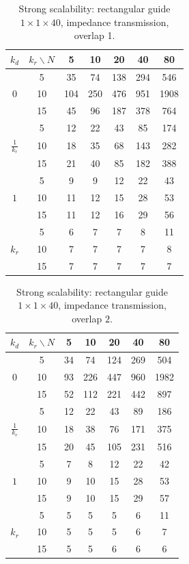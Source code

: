 \documentclass[smallextended]{svjour3}       %
\begin{document}
\begin{table}[h]
\centering
\setlength{\tabcolsep}{3pt}
\renewcommand{\arraystretch}{1.05}
\caption{Strong scalability: rectangular guide \(1\times 1\times 40\), impedance transmission, overlap 1.}
\label{tab:strong-imp-o0}
\begin{tabular}{|c||c|c|c|c|c|c|}
\hline
$k_d$ & $ k_r \backslash N$ & 5 & 10 & 20 & 40 & 80 \\
\hline
 & 5  & 35  & 74  & 138  & 294  & 546  \\
$0$         & 10 & 104 & 250 & 476  & 951  & 1908 \\
         & 15 & 45  & 96  & 187  & 378  & 764  \\
\hline\hline
 & 5  & 12  & 22  & 43   & 85   & 174  \\
$\frac{1}{k_r}$          & 10 & 18  & 35  & 68   & 143  & 282  \\
          & 15 & 21  & 40  & 85   & 182  & 388  \\
\hline\hline
 & 5  & 9   & 9   & 12  & 22  & 43  \\
$1$      & 10 & 11  & 12  & 15  & 28  & 53  \\
      & 15 & 11  & 12  & 16  & 29  & 56  \\
\hline\hline
 & 5  & 6   & 7   & 7  & 8  & 11  \\
$k_r$      & 10 & 7  & 7  & 7  & 7  & 8  \\
      & 15 & 7  & 7  & 7  & 7  & 7  \\
\hline
\end{tabular}
\end{table}

\begin{table}[h]
\centering
\setlength{\tabcolsep}{3pt}
\renewcommand{\arraystretch}{1.05}
\caption{Strong scalability: rectangular guide \(1\times 1\times 40\), impedance transmission, overlap \(2\).}
\label{tab:strong-imp-o2}
\begin{tabular}{|c||c|c|c|c|c|c|}
\hline
$k_d$ & $ k_r \backslash N$ & 5 & 10 & 20 & 40 & 80 \\
\hline
 & 5  & 34  & 74  & 124  & 269  & 504  \\
$0$         & 10 & 93 & 226 & 447  & 960  & 1982 \\
         & 15 & 52  & 112  & 221  & 442   & 897  \\
\hline\hline
 & 5  & 12  & 22  & 43   & 89   & 186  \\
$\frac{1}{k_r}$          & 10 & 18  & 38  & 76   & 171  & 375  \\
          & 15 & 20  & 45  & 105  & 231  & 516  \\
\hline\hline
 & 5  & 7   & 8   & 12  & 22  & 42  \\
$1$      & 10 & 9  & 10  & 15  & 28  & 53  \\
      & 15 & 9  & 10  & 15  & 29  & 57   \\
\hline\hline
 & 5  & 5   & 5   & 5  & 6  & 11  \\
$k_r$      & 10 & 5  & 5  & 5  & 6  & 7  \\
      & 15 & 5  & 5  & 6  & 6  & 6  \\
\hline
\end{tabular}
\end{table}
\end{document}
